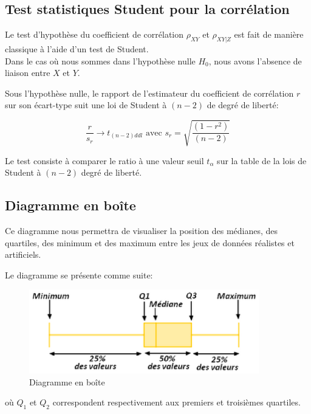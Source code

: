 \documentclass[a4paper]{article}
\begin{document}
\newpage
\subsection{Test statistiques Student pour la corrélation}

Le test d'hypothèse du coefficient de corrélation $\rho_{XY}$ et $\rho_{XY|Z}$ est fait de manière classique à l'aide d'un test de Student.{\\}
Dans le cas où nous sommes dans  l'hypothèse nulle $H_{0}$, nous avons l'absence de liaison entre $X$ et $Y$. 

Sous l'hypothèse nulle, le rapport de l'estimateur du coefficient de corrélation $r$ sur son écart-type suit une loi de Student à $(n-2)$ de degré de liberté:

$$\frac{r}{s_{r}} \longrightarrow t_{(n-2)ddl}\text{  avec  } s_{r}=\sqrt{\frac{(1-r^{2})}{(n-2)}}$$

Le test consiste à comparer le ratio à une valeur seuil $t_{\alpha}$ sur la table de la lois de Student à $(n-2)$ degré de liberté.


\subsection{Diagramme en boîte}

Ce diagramme nous permettra de  visualiser la position des médianes, des quartiles, des minimum et des maximum entre les jeux de données réalistes et artificiels.

Le diagramme se présente comme suite:
\begin{figure}[H] 
    \center
    \includegraphics[width=10cm]{boiteanmoustache.eps} 
    \caption{Diagramme en boîte} 
\end{figure}
où
$Q_{1}$ et $Q_{2}$ correspondent respectivement aux premiers et troisièmes quartiles.
\end{document}
